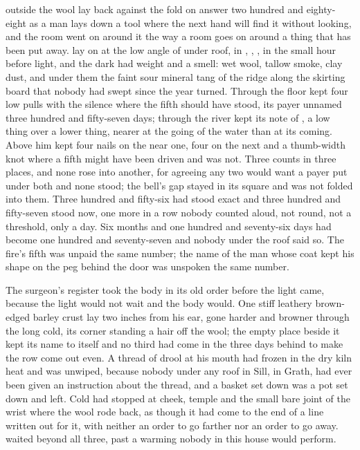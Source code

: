 
 outside the wool lay back against the fold on answer two hundred and eighty-eight as a man lays down a tool where the next hand will find it without looking, and the room went on around it the way a room goes on around a thing that has been put away.  lay on  at the low angle of  under  roof, in , , , in the small hour before light, and the dark had weight and a smell: wet wool, tallow smoke, clay dust, and under them the faint sour mineral tang of the ridge along the skirting board that nobody had swept since the year turned. Through the floor  kept four low pulls with the silence where the fifth should have stood, its payer unnamed three hundred and fifty-seven days; through  the river kept its note of , a low thing over a lower thing, nearer at the going of the water than at its coming. Above him  kept four nails on the near one, four on the next and a thumb-width knot where a fifth might have been driven and was not. Three counts in three places, and none rose into another, for agreeing any two would want a payer put under both and none stood; the bell's gap stayed in its square and was not folded into them. Three hundred and fifty-six had stood exact and three hundred and fifty-seven stood now, one more in a row nobody counted aloud, not round, not a threshold, only a day. Six months and one hundred and seventy-six days had become one hundred and seventy-seven and nobody under the roof said so. The fire's fifth was unpaid the same number; the name of the man whose coat kept his shape on the peg behind the door was unspoken the same number.

The surgeon's register took the body in its old order before the light came, because the light would not wait and the body would. One stiff leathery brown-edged barley crust lay two inches from his ear, gone harder and browner through the long cold, its corner standing a hair off the wool; the empty place beside it kept its name to itself and no third had come in the three days behind to make the row come out even. A thread of drool at his mouth had frozen in the dry kiln heat and was unwiped, because nobody under any roof in Sill, in Grath, had ever been given an instruction about the thread, and a basket set down was a pot set down and left. Cold had stopped at cheek, temple and the small bare joint of the wrist where the wool rode back, as though it had come to the end of a line written out for it, with neither an order to go farther nor an order to go away.  waited beyond all three, past a warming nobody in this house would perform.

